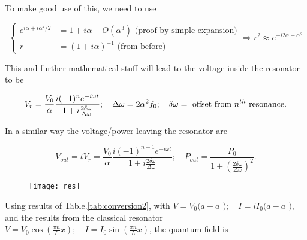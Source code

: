  \noindent To make good use of this, we need to use

 \begin{equation}\label{tlineApprox}
   \left\lbrace
     \begin{aligned}
       e^{i\alpha+i\alpha^2/2} & = 1+i\alpha +O(\alpha^3) \text{ (proof by simple expansion)}\\
       r & = (1+i\alpha)^{-1} \text{ (from before)}
     \end{aligned}\right.\Rightarrow r^2 \approx e^{-i2\alpha
     +\alpha^2}
 \end{equation}

 \noindent  This  and further  mathematical  stuff  will lead  to  the
 voltage inside the resonator to be

 \begin{equation}\label{tlineVoltage}
   V_r = \frac{V_0}{\alpha}\frac{i(-1)^{n}e^{-i\omega t}}{1+i\frac{2\delta\omega}{\Delta\omega}};\quad \Delta\omega = 2\alpha^2f_0;\quad \delta\omega = \text{ offset from $ n^{th} $ resonance}.
 \end{equation}

 \noindent  {}
 In a similar way the voltage/power leaving the resonator are

 \begin{equation}\label{tlineLeaving}
   V_{out} = tV_r = \frac{V_0}{\alpha}\frac{i(-1)^{n+1}e^{-i\omega t}}{1+i\frac{2\delta\omega}{\Delta\omega}}; \quad P_{out} = \frac{P_0}{1+\left(\frac{2\delta\omega}{\Delta\omega}\right)^2}.
 \end{equation}




   \begin{figure}[h]
     \centering%
     \texttt{[image: res]}
   \end{figure}

   Using     results      of     Table.\ref{tab:conversion2},     with
   $      V      =      V_0\bigg(a+a^\dagger\bigg);\quad      I      =
   iI_0\bigg(a-a^\dagger\bigg) $,  and the results from  the classical
   resonator
   $ V=V_0\cos(\frac{\pi n}{L}x);\quad  I=I_0\sin(\frac{\pi n}{L}x) $, the
   quantum field is

